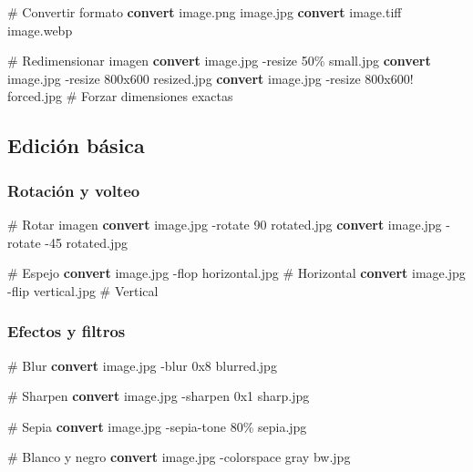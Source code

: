 \documentclass[
  11pt,
  letterpaper,
  oneside,
  openany]{scrbook}
\newenvironment{Shaded}{}{}
\newcommand{\AttributeTok}[1]{\textcolor[rgb]{0.84,0.23,0.29}{#1}}
\newcommand{\CommentTok}[1]{\textcolor[rgb]{0.42,0.45,0.49}{#1}}
\newcommand{\ExtensionTok}[1]{\textcolor[rgb]{0.84,0.23,0.29}{\textbf{#1}}}
\newcommand{\NormalTok}[1]{\textcolor[rgb]{0.14,0.16,0.18}{#1}}
\begin{document}
\begin{Shaded}
\begin{Highlighting}[]
\CommentTok{\# Convertir formato}
\ExtensionTok{convert}\NormalTok{ image.png image.jpg}
\ExtensionTok{convert}\NormalTok{ image.tiff image.webp}

\CommentTok{\# Redimensionar imagen}
\ExtensionTok{convert}\NormalTok{ image.jpg }\AttributeTok{{-}resize}\NormalTok{ 50\% small.jpg}
\ExtensionTok{convert}\NormalTok{ image.jpg }\AttributeTok{{-}resize}\NormalTok{ 800x600 resized.jpg}
\ExtensionTok{convert}\NormalTok{ image.jpg }\AttributeTok{{-}resize}\NormalTok{ 800x600! forced.jpg  }\CommentTok{\# Forzar dimensiones exactas}
\end{Highlighting}
\end{Shaded}

\subsection{Edición básica}\label{ediciuxf3n-buxe1sica}

\subsubsection{Rotación y volteo}\label{rotaciuxf3n-y-volteo}

\begin{Shaded}
\begin{Highlighting}[]
\CommentTok{\# Rotar imagen}
\ExtensionTok{convert}\NormalTok{ image.jpg }\AttributeTok{{-}rotate}\NormalTok{ 90 rotated.jpg}
\ExtensionTok{convert}\NormalTok{ image.jpg }\AttributeTok{{-}rotate} \AttributeTok{{-}45}\NormalTok{ rotated.jpg}

\CommentTok{\# Espejo}
\ExtensionTok{convert}\NormalTok{ image.jpg }\AttributeTok{{-}flop}\NormalTok{ horizontal.jpg  }\CommentTok{\# Horizontal}
\ExtensionTok{convert}\NormalTok{ image.jpg }\AttributeTok{{-}flip}\NormalTok{ vertical.jpg    }\CommentTok{\# Vertical}
\end{Highlighting}
\end{Shaded}

\subsubsection{Efectos y filtros}\label{efectos-y-filtros-1}

\begin{Shaded}
\begin{Highlighting}[]
\CommentTok{\# Blur}
\ExtensionTok{convert}\NormalTok{ image.jpg }\AttributeTok{{-}blur}\NormalTok{ 0x8 blurred.jpg}

\CommentTok{\# Sharpen}
\ExtensionTok{convert}\NormalTok{ image.jpg }\AttributeTok{{-}sharpen}\NormalTok{ 0x1 sharp.jpg}

\CommentTok{\# Sepia}
\ExtensionTok{convert}\NormalTok{ image.jpg }\AttributeTok{{-}sepia{-}tone}\NormalTok{ 80\% sepia.jpg}

\CommentTok{\# Blanco y negro}
\ExtensionTok{convert}\NormalTok{ image.jpg }\AttributeTok{{-}colorspace}\NormalTok{ gray bw.jpg}
\end{Highlighting}
\end{Shaded}
\end{document}
